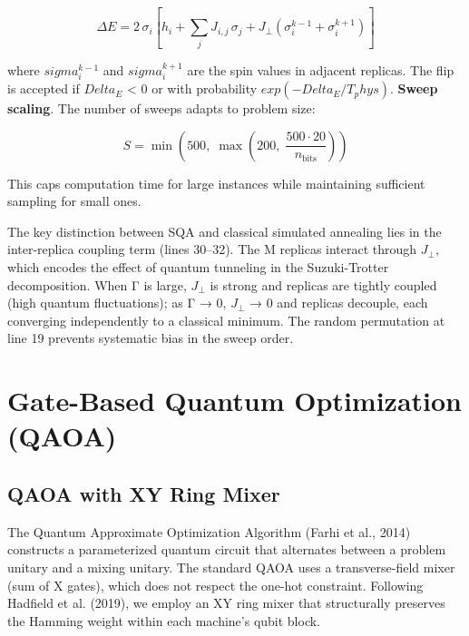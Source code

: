 \begin{equation}
\Delta E = 2 \, \sigma_i \left[
h_i + \sum_{j} J_{i,j} \, \sigma_j + J_{\perp} \left( \sigma_i^{k-1} + \sigma_i^{k+1} \right)
\right]
\end{equation}

where $sigma_i^{k-1}$ and $sigma_i^{k+1}$ are the spin values in adjacent replicas. The flip is accepted if $Delta_E$ < 0 or with probability $exp(-Delta_E / T_phys)$. \textbf{Sweep scaling}. The number of sweeps adapts to problem size:

\begin{equation}
S = \min\!\left(500,\; \max\!\left(200,\; \frac{500 \cdot 20}{n_{\text{bits}}}\right)\right)
\end{equation}

This caps computation time for large instances while maintaining sufficient sampling for small ones.

The key distinction between SQA and classical simulated annealing lies in the inter-replica coupling term (lines 30–32). The M replicas interact through $J_⊥$, which encodes the effect of quantum tunneling in the Suzuki-Trotter decomposition. When Γ is large, $J_⊥$ is strong and replicas are tightly coupled (high quantum fluctuations); as Γ → 0, $J_⊥$ → 0 and replicas decouple, each converging independently to a classical minimum. The random permutation at line 19 prevents systematic bias in the sweep order.

\section{Gate-Based Quantum Optimization (QAOA)}
\subsection{QAOA with XY Ring Mixer}
The Quantum Approximate Optimization Algorithm (Farhi et al., 2014) constructs a parameterized quantum circuit that alternates between a problem unitary and a mixing unitary. The standard QAOA uses a transverse-field mixer (sum of X gates), which does not respect the one-hot constraint. Following Hadfield et al. (2019), we employ an XY ring mixer that structurally preserves the Hamming weight within each machine's qubit block.

